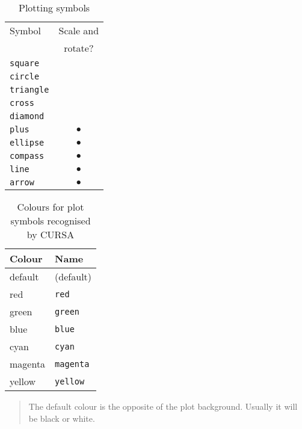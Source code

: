 \documentclass[twoside,11pt]{article}
\renewcommand{\_}{\texttt{\symbol{95}}}
\begin{document}
\pagebreak
\begin{table}
\begin{center}
\begin{tabular}{lc}
Symbol & Scale and \\
       & rotate?   \\ \hline
{\tt square}   &   \\
{\tt circle}   &   \\
{\tt triangle} &   \\
{\tt cross}    &   \\
{\tt diamond}  &   \\
{\tt plus}     &  $\bullet$ \\
{\tt ellipse}  &  $\bullet$ \\
{\tt compass}  &  $\bullet$ \\
{\tt line}     &  $\bullet$ \\
{\tt arrow}    &  $\bullet$ \\
\end{tabular}
\end{center}

\begin{center}
\caption{Plotting symbols \label{PLOTTING_SYMBOLS} }
\end{center}

\end{table}

\begin{table}[htbp]

\begin{center}
\begin{tabular}{ll}
Colour   & Name \\ \hline
default  & (default)      \\
red      & {\tt red}      \\
green    & {\tt green}    \\
blue     & {\tt blue}     \\
cyan     & {\tt cyan}     \\
magenta  & {\tt magenta}  \\
yellow   & {\tt yellow}   \\
\end{tabular}
\end{center}

\begin{quote}
The default colour is the opposite of the plot background.  Usually
it will be black or white.
\end{quote}

\begin{center}
\caption{Colours for plot symbols recognised by CURSA \label{CURSA_COLOURS} }
\end{center}

\end{table}
\end{document}
